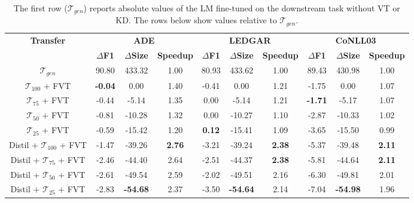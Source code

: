 \documentclass[11pt]{article}
\def\tok{\mathcal{T}}
\def\tokgen{\mathcal{T}_{gen}}
\begin{document}
\begin{table}[ht]
    \setlength\tabcolsep{4.1pt}
    \begin{tabular}{cccccccccc}
        \hline
        \multirow{2}{*}{\textbf{Transfer}} & 
        \multicolumn{3}{c}{\textbf{ADE}} & \multicolumn{3}{c}{\textbf{LEDGAR}} & \multicolumn{3}{c}{\textbf{CoNLL03}} \\
        
         & $\Delta$\textbf{F1} & $\Delta$\textbf{Size} & \textbf{Speedup} & 
         $\Delta$\textbf{F1} & $\Delta$\textbf{Size} & \textbf{Speedup} &
         $\Delta$\textbf{F1} & $\Delta$\textbf{Size} & \textbf{Speedup}  \\ \hline
        
        $\tokgen$ & 90.80 & 433.32 & 1.00 & 80.93 & 433.62 & 1.00 & 89.43 & 430.98 & 1.00\\ \hline


        $\tok_{100}$ + FVT & \textbf{-0.04} & 0.00   & 1.40 & -0.41         & 0.00   & 1.21 & -1.75          & 0.00   & 1.07\\
        $\tok_{75}$  + FVT & -0.44          & -5.14  & 1.35 & 0.00          & -5.14  & 1.21 & \textbf{-1.71} & -5.17  & 1.07\\
        $\tok_{50}$  + FVT & -0.81          & -10.28 & 1.32 & 0.00          & -10.27 & 1.10 & -2.87          & -10.33 & 1.02\\
        $\tok_{25}$  + FVT & -0.59          & -15.42 & 1.20 & \textbf{0.12} & -15.41 & 1.09 & -3.65          & -15.50 & 0.99\\ \hline
        
        Distil + $\tok_{100}$ + FVT & -1.47 & -39.26 & \textbf{2.76} & -3.21 & -39.24 & \textbf{2.38} & -5.37 & -39.48 & \textbf{2.11}\\
        Distil + $\tok_{75}$  + FVT & -2.46 & -44.40 & 2.64 & -2.51 & -44.37 & \textbf{2.38} & -5.81 & -44.64 & \textbf{2.11}\\
        Distil + $\tok_{50}$  + FVT & -2.61 & -49.54 & 2.59 & -2.02 & -49.51 & 2.16 & -6.30 & -49.81 & 2.01\\
        Distil + $\tok_{25}$  + FVT & -2.83 & \textbf{-54.68} & 2.37 & -3.50 & \textbf{-54.64} & 2.14 & -7.04 & \textbf{-54.98} & 1.96\\ \hline
    \end{tabular} \caption{The first row ($\tokgen$) reports absolute values of the LM fine-tuned on the downstream task without VT or KD. The rows below show values relative to $\tokgen$.}\label{tab:relative results}
\end{table}
\end{document}
